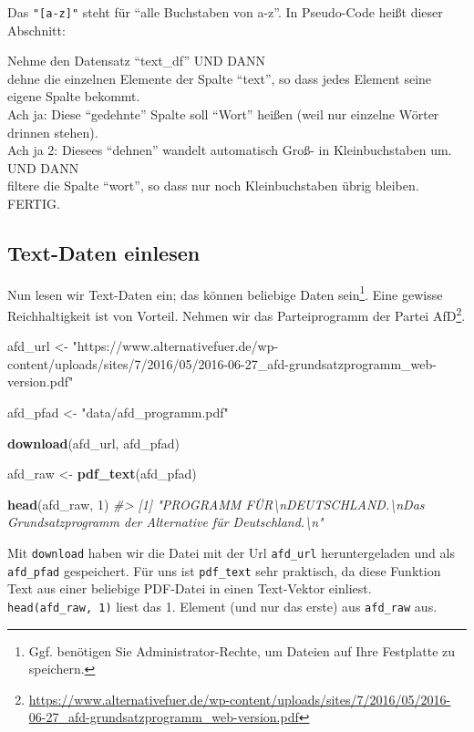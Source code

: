 \documentclass[12pt,ngerman,]{book}
\makeatletter
\newenvironment{Shaded}{\begin{snugshade}}{\end{snugshade}}
\newcommand{\KeywordTok}[1]{\textcolor[rgb]{0.13,0.29,0.53}{\textbf{{#1}}}}
\newcommand{\DecValTok}[1]{\textcolor[rgb]{0.00,0.00,0.81}{{#1}}}
\newcommand{\StringTok}[1]{\textcolor[rgb]{0.31,0.60,0.02}{{#1}}}
\newcommand{\CommentTok}[1]{\textcolor[rgb]{0.56,0.35,0.01}{\textit{{#1}}}}
\newcommand{\NormalTok}[1]{{#1}}
\let\rmarkdownfootnote\footnote%
\def\footnote{\protect\rmarkdownfootnote}
\newenvironment{kframe}{%
\medskip{}
\setlength{\fboxsep}{.8em}
 \def\at@end@of@kframe{}%
 \ifinner\ifhmode%
  \def\at@end@of@kframe{\end{minipage}}%
  \begin{minipage}{\columnwidth}%
 \fi\fi%
 \def\FrameCommand##1{\hskip\@totalleftmargin \hskip-\fboxsep
 \colorbox{shadecolor}{##1}\hskip-\fboxsep
     \hskip-\linewidth \hskip-\@totalleftmargin \hskip\columnwidth}%
 \MakeFramed {\advance\hsize-\width
   \@totalleftmargin\z@ \linewidth\hsize
   \@setminipage}}%
 {\par\unskip\endMakeFramed%
 \at@end@of@kframe}
\renewenvironment{Shaded}{\begin{kframe}}{\end{kframe}}
\let\BeginKnitrBlock\begin \let\EndKnitrBlock\end
\makeatother
\begin{document}
Das \texttt{"{[}a-z{]}"} steht für ``alle Buchstaben von a-z''. In
Pseudo-Code heißt dieser Abschnitt:

\BeginKnitrBlock{rmdpseudocode}
Nehme den Datensatz ``text\_df'' UND DANN\\
dehne die einzelnen Elemente der Spalte ``text'', so dass jedes Element
seine eigene Spalte bekommt.\\
Ach ja: Diese ``gedehnte'' Spalte soll ``Wort'' heißen (weil nur
einzelne Wörter drinnen stehen).\\
Ach ja 2: Diesees ``dehnen'' wandelt automatisch Groß- in
Kleinbuchstaben um. UND DANN\\
filtere die Spalte ``wort'', so dass nur noch Kleinbuchstaben übrig
bleiben. FERTIG.
\EndKnitrBlock{rmdpseudocode}

\subsection{Text-Daten einlesen}\label{text-daten-einlesen}

Nun lesen wir Text-Daten ein; das können beliebige Daten sein\footnote{Ggf.
  benötigen Sie Administrator-Rechte, um Dateien auf Ihre Festplatte zu
  speichern.}. Eine gewisse Reichhaltigkeit ist von Vorteil. Nehmen wir
das Parteiprogramm der Partei AfD\footnote{\url{https://www.alternativefuer.de/wp-content/uploads/sites/7/2016/05/2016-06-27_afd-grundsatzprogramm_web-version.pdf}}.

\begin{Shaded}
\begin{Highlighting}[]
\NormalTok{afd_url <-}\StringTok{ "https://www.alternativefuer.de/wp-content/uploads/sites/7/2016/05/2016-06-27_afd-grundsatzprogramm_web-version.pdf"}

\NormalTok{afd_pfad <-}\StringTok{ "data/afd_programm.pdf"}

\KeywordTok{download}\NormalTok{(afd_url, afd_pfad)}

\NormalTok{afd_raw <-}\StringTok{ }\KeywordTok{pdf_text}\NormalTok{(afd_pfad)}

\KeywordTok{head}\NormalTok{(afd_raw, }\DecValTok{1}\NormalTok{)}
\CommentTok{#> [1] "PROGRAMM FÜR\textbackslash{}nDEUTSCHLAND.\textbackslash{}nDas Grundsatzprogramm der Alternative für Deutschland.\textbackslash{}n"}
\end{Highlighting}
\end{Shaded}

Mit \texttt{download} haben wir die Datei mit der Url \texttt{afd\_url}
heruntergeladen und als \texttt{afd\_pfad} gespeichert. Für uns ist
\texttt{pdf\_text} sehr praktisch, da diese Funktion Text aus einer
beliebige PDF-Datei in einen Text-Vektor einliest.
\texttt{head(afd\_raw,\ 1)} liest das 1. Element (und nur das erste) aus
\texttt{afd\_raw} aus.
\end{document}
